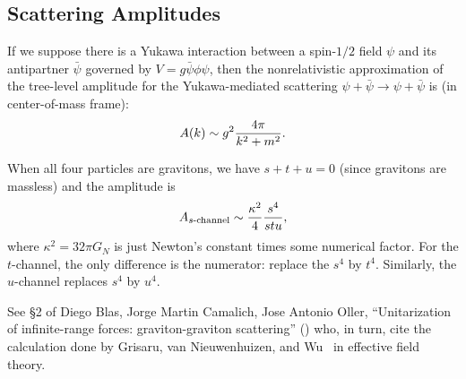 \subsection{Scattering Amplitudes}


If we suppose there is a Yukawa interaction between a spin-$1/2$ field
$\psi$ and its antipartner $\bar{\psi}$ governed by
$V= g\bar{\psi}\phi\psi$, then the nonrelativistic approximation of the tree-level amplitude for the Yukawa-mediated scattering $\psi+\bar{\psi}\to\psi+\bar{\psi}$
is (in center-of-mass frame):
\begin{equation}
A(k) \sim g^{2}\frac{4\pi}{k^{2}+m^{2}}.
\end{equation}

When all four particles are gravitons, we have $s+t+u=0$ (since
gravitons are massless) and the amplitude is
\begin{equation}
A_{\text{$s$-channel}}\sim\frac{\kappa^{2}}{4}\frac{s^{4}}{stu},
\end{equation}
where $\kappa^{2}=32\pi G_{N}$ is just Newton's constant times some
numerical factor.
For the $t$-channel, the only difference is the numerator: replace the
$s^{4}$ by $t^{4}$. Similarly, the $u$-channel replaces $s^{4}$ by $u^{4}$.

See \S2 of Diego Blas, Jorge Martin Camalich, Jose Antonio Oller, ``Unitarization of infinite-range forces: graviton-graviton scattering'' ()
who, in turn, cite the calculation done by Grisaru, van Nieuwenhuizen, and Wu~\cite{Grisaru:1975bx}
in effective field theory.

